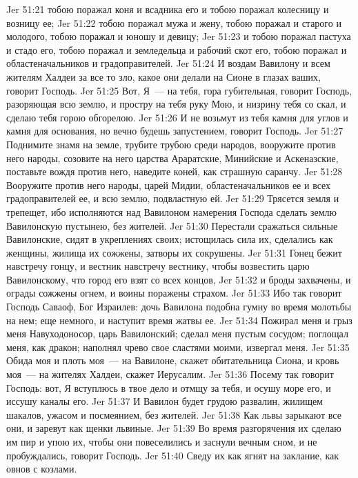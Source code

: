 \vs Jer 51:21 тобою поражал коня и всадника его и тобою поражал колесницу и возницу ее;
\vs Jer 51:22 тобою поражал мужа и жену, тобою поражал и старого и молодого, тобою поражал и юношу и девицу;
\vs Jer 51:23 и тобою поражал пастуха и стадо его, тобою поражал и земледельца и рабочий скот его, тобою поражал и областеначальников и градоправителей.
\vs Jer 51:24 И воздам Вавилону и всем жителям Халдеи за все то зло, какое они делали на Сионе в глазах ваших, говорит Господь.
\vs Jer 51:25 Вот, Я~--- на тебя, гора губительная, говорит Господь, разоряющая всю землю, и простру на тебя руку Мою, и низрину тебя со скал, и сделаю тебя горою обгорелою.
\vs Jer 51:26 И не возьмут из тебя камня для углов и камня для основания, но вечно будешь запустением, говорит Господь.
\vs Jer 51:27 Поднимите знамя на земле, трубите трубою среди народов, вооружите против него народы, созовите на него царства Араратские, Минийские и Аскеназские, поставьте вождя против него, наведите коней, как страшную саранчу.
\vs Jer 51:28 Вооружите против него народы, царей Мидии, областеначальников ее и всех градоправителей ее, и всю землю, подвластную ей.
\vs Jer 51:29 Трясется земля и трепещет, ибо исполняются над Вавилоном намерения Господа сделать землю Вавилонскую пустынею, без жителей.
\vs Jer 51:30 Перестали сражаться сильные Вавилонские, сидят в укреплениях своих; истощилась сила их, сделались как женщины, жилища их сожжены, затворы их сокрушены.
\vs Jer 51:31 Гонец бежит навстречу гонцу, и вестник навстречу вестнику, чтобы возвестить царю Вавилонскому, что город его взят со всех концов,
\vs Jer 51:32 и броды захвачены, и ограды сожжены огнем, и воины поражены страхом.
\vs Jer 51:33 Ибо так говорит Господь Саваоф, Бог Израилев: дочь Вавилона подобна гумну во время молотьбы на нем; еще немного, и наступит время жатвы ее.
\vs Jer 51:34 Пожирал меня и грыз меня Навуходоносор, царь Вавилонский; сделал меня пустым сосудом; поглощал меня, как дракон; наполнял чрево свое сластями моими, извергал меня.
\vs Jer 51:35 Обида моя и плоть моя~--- на Вавилоне, скажет обитательница Сиона, и кровь моя~--- на жителях Халдеи, скажет Иерусалим.
\vs Jer 51:36 Посему так говорит Господь: вот, Я вступлюсь в твое дело и отмщу за тебя, и осушу море его, и иссушу каналы его.
\vs Jer 51:37 И Вавилон будет грудою развалин, жилищем шакалов, ужасом и посмеянием, без жителей.
\vs Jer 51:38 Как львы зарыкают все они, и заревут как щенки львиные.
\vs Jer 51:39 Во время разгорячения их сделаю им пир и упою их, чтобы они повеселились и заснули вечным сном, и не пробуждались, говорит Господь.
\vs Jer 51:40 Сведу их как ягнят на заклание, как овнов с козлами.
